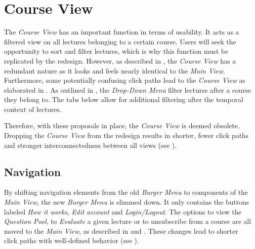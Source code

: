 \section{Course View}
The \emph{Course View} has an important function in terms of usability. It acts as a filtered view on all lectures belonging to a certain course. Users will seek the opportunity to sort and filter lectures, which is why this function must be replicated by the redesign. However, as described in , the \emph{Course View} has a redundant nature as it looks and feels nearly identical to the \emph{Main View}.
Furthermore, some potentially confusing click paths lead to the \emph{Course View} as elaborated in .
As outlined in , the \emph{Drop-Down Menu} filter lectures after a course they belong to. The tabs below allow for additional filtering after the temporal context of lectures. 

Therefore, with these proposals in place, the \emph{Course View} is deemed obsolete. Dropping the \emph{Course View} from the redesign results in shorter, fewer click paths and stronger interconnectedness between all views (see ).

\subsection{Navigation}
By shifting navigation elements from the old \emph{Burger Menu} to components of the \emph{Main View}, the new \emph{Burger Menu} is slimmed down.
It only contains the buttons labeled \emph{How it works}, \emph{Edit account} and \emph{Login/Logout}. The options to view the \emph{Question Pool}, to \emph{Evaluate} a given lecture or to unsubscribe from a course are all moved to the \emph{Main View}, as described in   and .
These changes lead to shorter click paths with well-defined behavior (see \todogrf).


